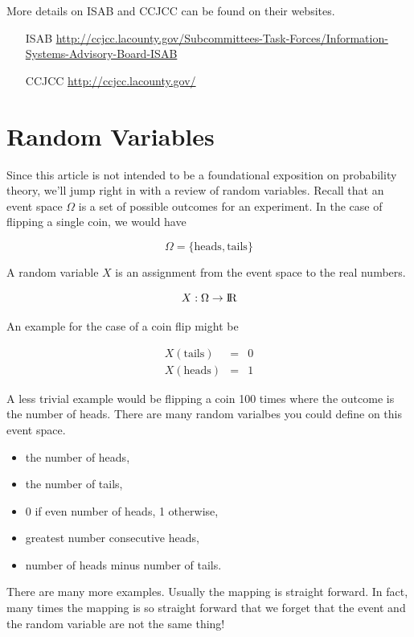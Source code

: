 \documentclass[]{article}
\begin{document}
More details on ISAB and CCJCC can be found on their websites.

\begin{itemize}
\item[ISAB] \href{http://ccjcc.lacounty.gov/Subcommittees-Task-Forces/Information-Systems-Advisory-Board-ISAB}{http://ccjcc.lacounty.gov/Subcommittees-Task-Forces/Information-Systems-Advisory-Board-ISAB}
\item[CCJCC] \href{http://ccjcc.lacounty.gov/}{http://ccjcc.lacounty.gov/}
\end{itemize}

\section*{Random Variables}

Since this article is not intended to be a foundational exposition on
probability theory, we'll jump right in with a review of random variables.
Recall that an event space $\Omega$ is a set of possible outcomes for an
experiment.  In the case of flipping a single coin, we would have

$$
\Omega = \{\mbox{heads}, \mbox{tails}\}
$$

A random variable $X$ is an assignment from the event space to the real
numbers.

$$
X: \Omega \rightarrow {\rm I\!R}
$$

An example for the case of a coin flip might be

\begin{eqnarray*}
X(\mbox{tails}) & = & 0\\
X(\mbox{heads}) & = & 1
\end{eqnarray*}

A less trivial example would be flipping a coin 100 times where
the outcome is the number of heads.  There are many random varialbes
you could define on this event space.

\begin{itemize}
\item the number of heads,
\item the number of tails,
\item 0 if even number of heads, 1 otherwise,
\item greatest number consecutive heads,
\item number of heads minus number of tails.
\end{itemize}

There are many more examples.  Usually the mapping is straight
forward.  In fact, many times the mapping is so straight forward
that we forget that the event and the random variable are not the
same thing!
\end{document}
